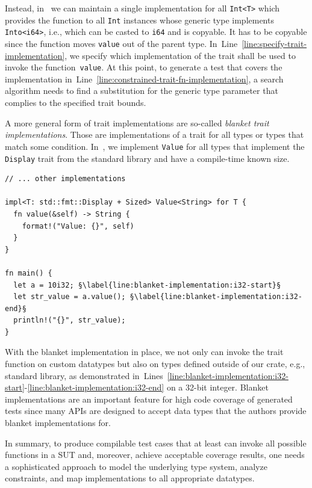 \documentclass[paper=a4,%
  twoside,%
  BCOR4mm,%
  abstract=true,%
  toc=bibliography,%
  chapterprefix=true,%
  toc=bibliographynumbered,%
  open=right,%
  english,%
  pagesize=pdftex]{scrreprt}
\newcommand{\sut}{\ac{SUT}\xspace}
\begin{document}
Instead, in~ we can maintain a single implementation for all \texttt{Int<T>} which provides the function to all \texttt{Int} instances whose generic type implements \texttt{Into<i64>}, i.e., which can be casted to \texttt{i64} and is copyable. It has to be copyable since the function moves \texttt{value} out of the parent type. In~Line~\ref{line:specify-trait-implementation}, we specify which implementation of the trait shall be used to invoke the function~\texttt{value}. At this point, to generate a test that covers the implementation in~Line~\ref{line:constrained-trait-fn-implementation}, a search algorithm needs to find a substitution for the generic type parameter that complies to the specified trait bounds.

A more general form of trait implementations are so-called \emph{blanket trait implementations}. Those are implementations of a trait for all types or types that match some condition. In~, we implement \texttt{Value} for all types that implement the \texttt{Display} trait from the standard library and have a compile-time known size.

\begin{lstlisting}[style=boxed, caption={Trait implementation for generic \texttt{Int}}, label=lst:constrained-trait-implementation, escapechar=§]
// ... other implementations

impl<T: std::fmt::Display + Sized> Value<String> for T {
  fn value(&self) -> String {
    format!("Value: {}", self)
  }
}

fn main() {
  let a = 10i32; §\label{line:blanket-implementation:i32-start}§
  let str_value = a.value(); §\label{line:blanket-implementation:i32-end}§
  println!("{}", str_value);
}
\end{lstlisting}

With the blanket implementation in place, we not only can invoke the trait function on custom datatypes but also on types defined outside of our crate, e.g., standard library, as demonstrated in~Lines~\ref{line:blanket-implementation:i32-start}-\ref{line:blanket-implementation:i32-end} on a 32-bit integer. Blanket implementations are an important feature for high code coverage of generated tests since many \acp{API} are designed to accept data types that the authors provide blanket implementations for.

In summary, to produce compilable test cases that at least can invoke all possible functions in a \sut and, moreover, achieve acceptable coverage results, one needs a sophisticated approach to model the underlying type system, analyze constraints, and map implementations to all appropriate datatypes.
\end{document}

